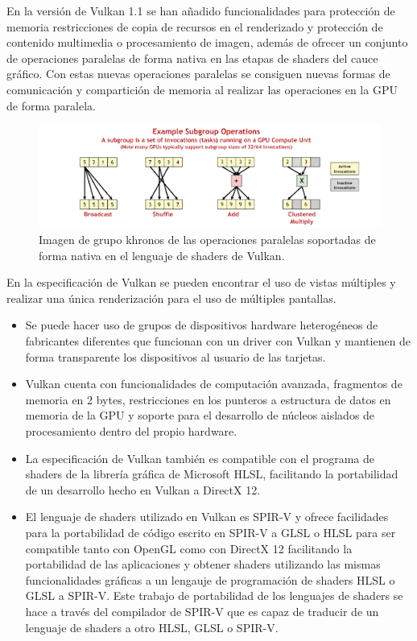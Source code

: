 \documentclass[a4paper, 17pt]{book}
\begin{document}
\vspace{1mm} %

En la versión de Vulkan 1.1 se han añadido funcionalidades para protección de memoria restricciones de copia de
recursos en el renderizado y protección de contenido multimedia o procesamiento de imagen, además de ofrecer
un conjunto de operaciones paralelas de forma nativa en las etapas de shaders del cauce gráfico. Con estas nuevas
operaciones paralelas se consiguen nuevas formas de comunicación y compartición de memoria al realizar las operaciones
en la GPU de forma paralela.

\begin{figure}[H]
    \centering
    \includegraphics[scale=0.75, keepaspectratio]{img/vulkan_op.png}
    \caption{Imagen de grupo khronos de las operaciones paralelas soportadas de forma nativa en el lenguaje de shaders de Vulkan.}
    \label{figura:khronos}
\end{figure}

En la especificación de Vulkan se pueden encontrar el uso de vistas múltiples y realizar una única renderización
para el uso de múltiples pantallas.


\begin{itemize}
  \item Se puede hacer uso de grupos de dispositivos hardware heterogéneos de fabricantes diferentes que
  funcionan con un driver con Vulkan y mantienen de forma transparente los dispositivos al usuario de las tarjetas.
  
  \item Vulkan cuenta con funcionalidades de computación avanzada, fragmentos de memoria en 2 bytes, restricciones en
  los punteros a estructura de datos en memoria de la GPU y soporte para el desarrollo de núcleos aislados de
  procesamiento dentro del propio hardware.

  \item La especificación de Vulkan también es compatible con el programa de shaders de la librería gráfica de Microsoft
  HLSL, facilitando la portabilidad de un desarrollo hecho en Vulkan a DirectX 12.

  \item El lenguaje de shaders utilizado en Vulkan es SPIR-V y ofrece facilidades para la portabilidad de código escrito
  en SPIR-V a GLSL o HLSL para ser compatible tanto con OpenGL como con DirectX 12 facilitando la portabilidad de las
  aplicaciones y obtener shaders utilizando las mismas funcionalidades gráficas a un lengauje de programación de
  shaders HLSL o GLSL a SPIR-V.  Este trabajo de portabilidad de los lenguajes de shaders se hace a través del
  compilador de SPIR-V que es capaz de traducir de un lenguaje de shaders a otro HLSL, GLSL o SPIR-V. 
  
\end{itemize}
\end{document}

